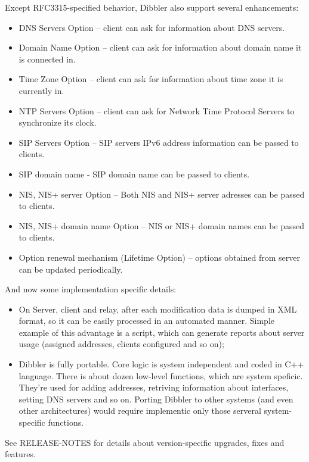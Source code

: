 Except RFC3315-specified behavior, Dibbler also support several enhancements:

\begin{itemize}
\item DNS Servers Option -- client can ask for information about DNS
  servers.
\item Domain Name Option -- client can ask for information about
  domain name it is connected in.
\item Time Zone Option -- client can ask for information about 
time zone it is currently in.
\item NTP Servers Option -- client can ask for Network Time Protocol
  Servers to synchronize its clock.
\item SIP Servers Option -- SIP servers IPv6 address information can
  be passed to clients.
\item SIP domain name - SIP domain name can be passed to clients.
\item NIS, NIS+ server Option -- Both NIS and NIS+ server adresses
  can be passed to clients.
\item NIS, NIS+ domain name Option -- NIS or NIS+ domain names can be
  passed to clients.
\item Option renewal mechanism (Lifetime Option) -- options obtained
  from server can be updated periodically.
\end{itemize}

And now some implementation specific details:
\begin{itemize}
\item On Server, client and relay, after each modification data is
  dumped in XML format, so it can be easily processed in an automated
  manner. Simple example of this advantage is a script, which can generate
  reports about server usage (assigned addresses, clients configured
  and so on);
\item Dibbler is fully portable. Core logic is system independent and
  coded in C++ language. There is about dozen low-level functions,
  which are system speficic. They're used for adding addresses,
  retriving information about interfaces, setting DNS servers and so
  on. Porting Dibbler to other systems (and even other architectures)
  would require implementic only those serveral system-specific
  functions.
\end{itemize}

See RELEASE-NOTES for details about version-specific upgrades, fixes
and features.